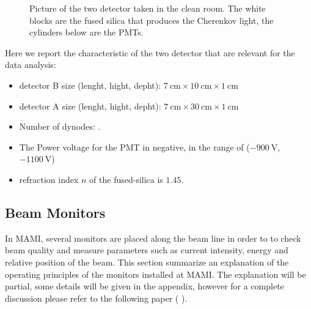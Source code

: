 \begin{figure}[hbtp]
\centering
{} \quad
{} \quad
	\label{fig:Detectors}
\caption{Picture of the two detector taken in the clean room. The white blocks are the fused silica that produces the Cherenkov light, the cylinders below are the PMTs.}
\end{figure}

Here we report the characteristic of the two detector that are relevant for the data analysis: 

\begin{itemize}
\item detector B size (lenght, hight, depht): $\SI{7}{\centi \meter} \times \SI{10}{\centi \meter} \times \SI{1}{\centi \meter}$
\item detector A size (lenght, hight, depht): $\SI{7}{\centi \meter} \times \SI{30}{\centi \meter} \times \SI{1}{\centi \meter}$
\item Number of dynodes: .
\item The Power voltage for the PMT in negative, in the range of ($\SI{-900}{\volt}$, $\SI{-1100}{\volt}$)
\item refraction index $n$ of the fused-silica is $1.45$.
\end{itemize}


\subsection{Beam Monitors}

In MAMI, several monitors are placed along the beam line in order to to check beam quality and measure parameters such as current intensity, energy and relative position of the beam. This section summarize an explanation of the operating principles of the monitors installed at MAMI. The explanation will be partial, some details will be given in the appendix, however for a complete discussion please refer to the following paper ( \cite{M_Dehn}).

